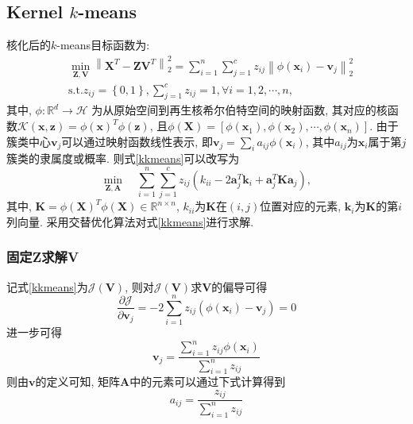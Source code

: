 \documentclass[lang=cn,10pt]{gorgeousnbook}
\numberwithin{equation}{section}%
\numberwithin{figure}{section}%
\begin{document}
\subsection{Kernel $k$-means}
核化后的$k$-means目标函数为:
\begin{equation}
\begin{aligned}
&\min_{\bm{Z},\bm{V}}\left\|\bm{X}^T-\bm{ZV}^T\right\|_{2}^{2} =\sum_{i=1}^n{\sum_{j=1}^cz_{ij}\left\|\phi(\boldsymbol{x}_i)-\boldsymbol{v}_j\right\|_2^2}\\
&\mathrm{s}.\mathrm{t}. z_{ij}=\left\{ 0,1 \right\} ,\sum_{j=1}^c{z_{ij}=1,\forall i=1,2,\cdots ,n,}
\end{aligned}\label{kkmeans}
\end{equation}
其中, $\phi : \mathbb{R}^d\rightarrow \mathcal{H}$ 为从原始空间到再生核希尔伯特空间的映射函数, 其对应的核函数$\mathcal{K}(\bm{x},\bm{z}) = \phi(\bm{x})^T\phi(\bm{z})$, 且$\phi(\bm{X}) = [\phi(\bm{x}_1),\phi(\bm{x}_2),\cdots,{\phi}(\bm{x}_n)]$. 
由于簇类中心$\bm{v}_j$可以通过映射函数线性表示, 即$\bm{v}_j = \sum_ia_{ij}\phi(\bm{x}_i)$, 其中$a_{ij}$为$\bm{x}_i$属于第$j$簇类的隶属度或概率. 则式\eqref{kkmeans}可以改写为
\begin{equation}
\min\limits_{\bm{Z},\bm{A}}\quad\sum\limits_{i=1}^n{\sum\limits_{j=1}^cz_{ij}(k_{ii}-2\boldsymbol{a}_j^T\boldsymbol{k}_i+\boldsymbol{a}_j^T\bm{K}\boldsymbol{a}_j)},
\end{equation}
其中, $\bm{K}=\phi(\bm{X})^T\phi(\bm{X})\in\mathbb{R}^{n\times n}$, $k_{ii}$为$\bm{K}$在$(i,j)$位置对应的元素, $\bm{k}_i$为$\bm{K}$的第$i$列向量. 采用交替优化算法对式\eqref{kkmeans}进行求解.
\subsubsection{固定\textbf{Z}求解\textbf{V}}
记式\eqref{kkmeans}为$\mathcal{J}(\bm{V})$, 则对$\mathcal{J}(\bm{V})$求$\bm{V}$的偏导可得
\begin{equation}
\frac{\partial \mathcal{J}}{\partial \boldsymbol{v}_j}=-2\sum_{i=1}^n{z_{ij}\left( \phi \left( \boldsymbol{x}_i \right) -\boldsymbol{v}_j \right)}=0
\end{equation}
进一步可得
\begin{equation}
\boldsymbol{v}_j=\frac{\sum_{i=1}^n{z_{ij}\phi \left( \boldsymbol{x}_i \right)}}{\sum_{i=1}^n{z_{ij}}}
\end{equation}
则由$\bm{v}$的定义可知, 矩阵$\bm{A}$中的元素可以通过下式计算得到
\begin{equation}
a_{ij}=\frac{z_{ij}}{\sum_{i=1}^n{z_{ij}}}
\end{equation}
\end{document}
